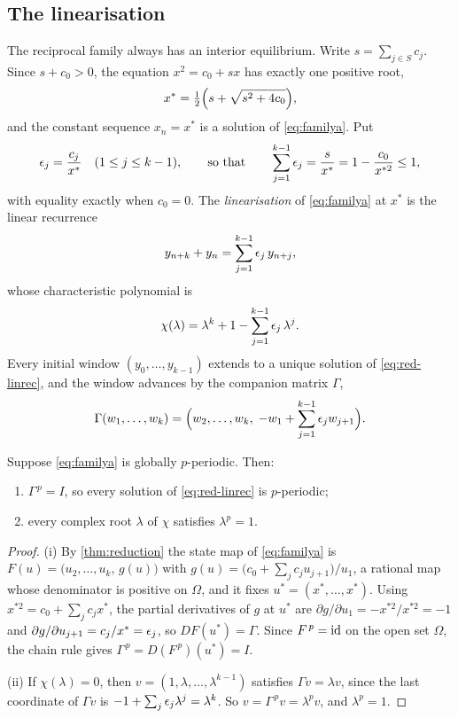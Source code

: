 \subsection{The linearisation}

The reciprocal family always has an interior equilibrium. Write
$s=\sum_{j\in S}c_j$. Since $s+c_0>0$, the equation $x^2=c_0+s x$
has exactly one positive root,
\begin{equation}
x^*=\tfrac12\Bigl(s+\sqrt{s^2+4c_0}\Bigr),
\end{equation}
and the constant sequence $x_n=x^*$ is a solution of \eqref{eq:familya}. Put
\begin{equation}
\epsilon_j=\frac{c_j}{x^*}\quad(1\le j\le k-1),
\qquad\text{so that}\qquad
\sum_{j=1}^{k-1}\epsilon_j=\frac{s}{x^*}=1-\frac{c_0}{x^{*2}}\le1,
\label{eq:red-ej}
\end{equation}
with equality exactly when $c_0=0$. The \textit{linearisation} of
\eqref{eq:familya} at $x^*$ is the linear recurrence
\begin{equation}
y_{n+k}+y_n=\sum_{j=1}^{k-1}\epsilon_j\,y_{n+j},
\label{eq:red-linrec}
\end{equation}
whose characteristic polynomial is
\begin{equation}
\chi(\lambda)=\lambda^k+1-\sum_{j=1}^{k-1}\epsilon_j\,\lambda^j .
\label{eq:red-chi}
\end{equation}
Every initial window $(y_0,\dots,y_{k-1})$ extends to a unique solution of
\eqref{eq:red-linrec}, and the window advances by the companion matrix $\Gamma$,
\[
\Gamma(w_1,\dots,w_k)=\Bigl(w_2,\dots,w_k,\;-w_1+\sum_{j=1}^{k-1}\epsilon_jw_{j+1}\Bigr).
\]

\begin{theorem}[linearisation]
\label{thm:spectral}
Suppose \eqref{eq:familya} is globally $p$-periodic. Then:
\begin{enumerate}
\item[(i)] $\Gamma^{\,p}=I$, so every solution of \eqref{eq:red-linrec} is
$p$-periodic;
\item[(ii)] every complex root $\lambda$ of $\chi$ satisfies $\lambda^p=1$.
\end{enumerate}
\end{theorem}

\begin{proof}
(i) By \autoref{thm:reduction} the state map of \eqref{eq:familya} is
$F(u)=\bigl(u_2,\dots,u_k,\,g(u)\bigr)$ with
$g(u)=\bigl(c_0+\sum_jc_ju_{j+1}\bigr)/u_1$, a rational map whose denominator
is positive on $\Omega$, and it fixes $u^*=(x^*,\dots,x^*)$. Using
$x^{*2}=c_0+\sum_jc_jx^*$, the partial derivatives of $g$ at $u^*$ are
$\partial g/\partial u_1=-x^{*2}/x^{*2}=-1$ and
$\partial g/\partial u_{j+1}=c_j/x^*=\epsilon_j$, so $DF(u^*)=\Gamma$. Since
$F^{\,p}=\mathrm{id}$ on the open set $\Omega$, the chain rule gives
$\Gamma^{\,p}=D(F^{\,p})(u^*)=I$.

(ii) If $\chi(\lambda)=0$, then $v=(1,\lambda,\dots,\lambda^{k-1})$ satisfies
$\Gamma v=\lambda v$, since the last coordinate of $\Gamma v$ is
$-1+\sum_j\epsilon_j\lambda^j=\lambda^k$. So $v=\Gamma^{\,p}v=\lambda^pv$, and
$\lambda^p=1$.
\end{proof}

